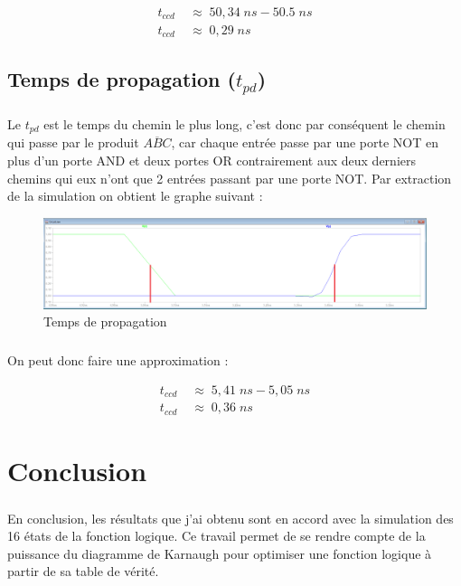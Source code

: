             \begin{align*}
                t_{ccd}\;&\approx\; 50,34\;ns - 50.5\;ns \\
                t_{ccd}\;&\approx\; 0,29\;ns
            \end{align*}
    
    \subsection{Temps de propagation ($t_{pd}$)}
        
        \subparagraph{}Le $t_{pd}$ est le temps du chemin le plus long, c'est donc par conséquent le chemin qui passe 
        par le produit $\overline{ABC}$, car chaque entrée passe par une porte NOT en plus d'un porte AND et deux 
        portes OR contrairement aux deux derniers chemins qui eux n'ont que 2 entrées passant par une porte NOT. Par 
        extraction de la simulation on obtient le graphe suivant :
        
            \begin{figure}[H]
                \centering
                \includegraphics[width=\textwidth]{../pictures/propagationT.png}
                \caption{Temps de propagation}
            \end{figure}
            
        \subparagraph{}On peut donc faire une approximation :
        
            \begin{align*}
                t_{ccd}\;&\approx\; 5,41\;ns - 5,05\;ns \\
                t_{ccd}\;&\approx\; 0,36\;ns
            \end{align*}
        

\section{Conclusion}

    \subparagraph{}En conclusion, les résultats que j'ai obtenu sont en accord avec la simulation des 16 états de la 
    fonction logique. Ce travail permet de se rendre compte de la puissance du diagramme de Karnaugh pour optimiser
    une fonction logique à partir de sa table de vérité.

